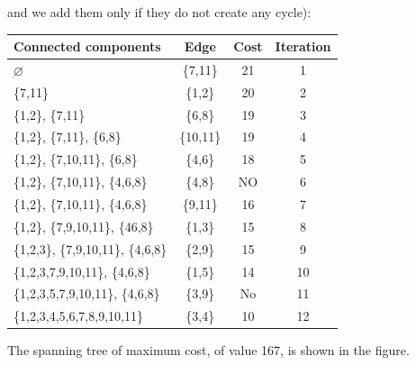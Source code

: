 \documentclass[12pt, a4paper]{report}
\newtheorem[style=M,bodystyle=\normalfont]{theorem}{Theorem}
\newtheorem[style=M,bodystyle=\normalfont]{corollary}{Corollary}
\newtheorem[style=M,bodystyle=\normalfont]{lemma}{Lemma}
\newtheorem[style=M,bodystyle=\normalfont]{definition}{Definition}
\begin{document}
\begin{enumerate}
                and we add them only if they do not create any cycle): 
                \begin{table}[H]
                    \centering
                    \begin{tabular}{lccc}
                    \hline
                    \textbf{Connected components}       & \textbf{Edge} & \textbf{Cost} & \textbf{Iteration} \\ \hline
                    $\varnothing$                       & \{7,11\}      & 21            & 1                  \\
                    \{7,11\}                            & \{1,2\}       & 20            & 2                  \\
                    \{1,2\}, \{7,11\}                   & \{6,8\}       & 19            & 3                  \\
                    \{1,2\}, \{7,11\}, \{6,8\}          & \{10,11\}     & 19            & 4                  \\
                    \{1,2\}, \{7,10,11\}, \{6,8\}       & \{4,6\}       & 18            & 5                  \\
                    \{1,2\}, \{7,10,11\}, \{4,6,8\}     & \{4,8\}       & NO            & 6                  \\
                    \{1,2\}, \{7,10,11\}, \{4,6,8\}     & \{9,11\}      & 16            & 7                  \\
                    \{1,2\}, \{7,9,10,11\}, \{46,8\}    & \{1,3\}       & 15            & 8                  \\
                    \{1,2,3\}, \{7,9,10,11\}, \{4,6,8\} & \{2,9\}       & 15            & 9                  \\
                    \{1,2,3,7,9,10,11\}, \{4,6,8\}      & \{1,5\}       & 14            & 10                 \\
                    \{1,2,3,5,7,9,10,11\}, \{4,6,8\}    & \{3,9\}       & No            & 11                 \\
                    \{1,2,3,4,5,6,7,8,9,10,11\}         & \{3,4\}       & 10            & 12                 \\ \hline
                    \end{tabular}
                \end{table}
                The spanning tree of maximum cost, of value 167, is shown in the figure. 
                \begin{figure}[H]
                    \centering

\end{figure}
\end{enumerate}
\end{document}
